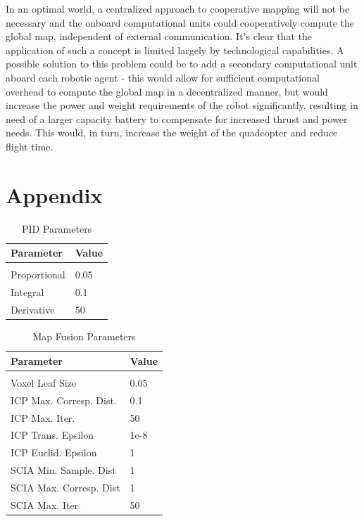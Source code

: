 \documentclass[letterpaper, oneside, 10pt]{report}
\begin{document}
In an optimal world, a centralized approach to cooperative mapping will not be necessary and the onboard computational units could cooperatively compute the global map, independent of external communication. It's clear that the application of such a concept is limited largely by technological capabilities. A possible solution to this problem could be to add a secondary computational unit aboard each robotic agent - this would allow for sufficient computational overhead to compute the global map in a decentralized manner, but would increase the power and weight requirements of the robot significantly, resulting in need of a larger capacity battery to compensate for increased thrust and power needs. This would, in turn, increase the weight of the quadcopter and reduce flight time.

\chapter{Appendix}

\begin{table}[h!]
  \centering
  \caption{PID Parameters}
  \vspace{2mm}
  \begin{tabular}{l l}
    \hline \hline
    \vspace{-2mm}
    Parameter & \multicolumn{1}{l}{Value} \\ [1ex]
    \hline
    & \\
    Proportional & 0.05 \\
    Integral & 0.1 \\
    Derivative & 50 \\
  \end{tabular}
\end{table}

\begin{table}[h!]
  \centering
  \caption{Map Fusion Parameters}
  \vspace{2mm}
  \begin{tabular}{l l}
    \hline \hline
    \vspace{-2mm}
    Parameter & \multicolumn{1}{l}{Value} \\ [1ex]
    \hline
    & \\
    Voxel Leaf Size & 0.05 \\
    ICP Max. Corresp. Dist. & 0.1 \\
    ICP Max. Iter. & 50 \\
    ICP Trans. Epsilon & 1e-8 \\
    ICP Euclid. Epsilon & 1 \\
    SCIA Min. Sample. Dist & 1 \\
    SCIA Max. Corresp. Dist & 1 \\
    SCIA Max. Iter. & 50 \\
  \end{tabular}
\end{table}

\clearpage



\end{document}
